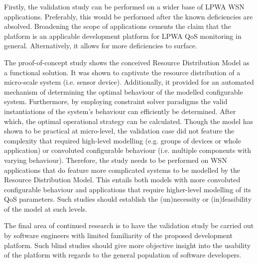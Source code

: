 Firstly, the validation study can be performed on a wider base of LPWA WSN applications. Preferably, this would be performed after the known deficiencies are absolved. Broadening the scope of applications cements the claim that the platform is an applicable development platform for LPWA QoS monitoring in general. Alternatively, it allows for more deficiencies to surface.

The proof-of-concept study shows the conceived Resource Distribution Model as a functional solution. It was shown to captivate the resource distribution of a micro-scale system (i.e. sensor device). Additionally, it provided for an automated mechanism of determining the optimal behaviour of the modelled configurable system. Furthermore, by employing constraint solver paradigms the valid instantiations of the system's behaviour can efficiently be determined. After which, the optimal operational strategy can be calculated. Though the model has shown to be practical at micro-level, the validation case did not feature the complexity that required high-level modelling (e.g. groups of devices or whole application) or convoluted configurable behaviour (i.e. multiple components with varying behaviour). Therefore, the study needs to be performed on WSN applications that do feature more complicated systems to be modelled by the Resource Distribution Model. This entails both models with more convoluted configurable behaviour and applications that require higher-level modelling of its QoS parameters. Such studies should establish the (un)necessity or (in)feasibility of the model at such levels.

The final area of continued research is to have the validation study be carried out by software engineers with limited familiarity of the proposed development platform. Such blind studies should give more objective insight into the usability of the platform with regards to the general population of software developers.
	

	
	


	

